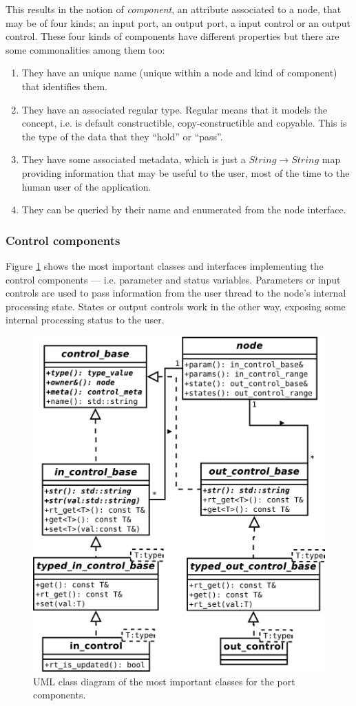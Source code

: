 This results in the notion of \emph{component}, an attribute
associated to a node, that may be of four kinds; an input port, an
output port, a input control or an output control. These four kinds of
components have different properties but there are some commonalities
among them too:
\begin{enumerate}
\item They have an unique name (unique within a node and kind of
  component) that identifies them.
\item They have an associated regular type. Regular means that it
  models the  concept, i.e. is default constructible,
  copy-constructible and copyable. This is the type of the data that
  they ``hold'' or ``pass''.
\item They have some associated metadata, which is just a $String
  \rightarrow String$ map providing information that may be useful to
  the user, most of the time to the human user of the application.
\item They can be queried by their name and enumerated from the node
  interface. 
\end{enumerate}

\subsubsection{Control components}

Figure \ref{fig:controls} shows the most important classes and
interfaces implementing the control components --- i.e. parameter and
status variables. Parameters or input controls are used to pass
information from the user thread to the node's internal processing
state. States or output controls work in the other way, exposing some
internal processing status to the user.

\begin{figure}[t]
  \centering
  \includegraphics[width=.8\textwidth]{pic/graph-ctl.pdf}
  \caption{UML class diagram of the most important classes for the
    port components.}
\label{fig:controls}
\end{figure}

